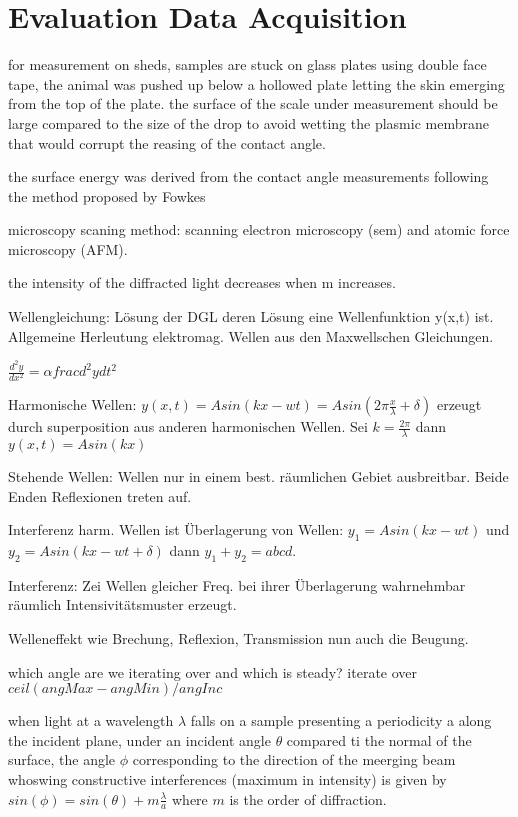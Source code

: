 
\section{Evaluation Data Acquisition}


for measurement on sheds, samples are stuck on glass plates using double face tape, the animal was pushed up below a hollowed plate letting the skin emerging from the top of the plate. the surface of the scale under measurement should be large compared to the size of the drop to avoid wetting the plasmic membrane that would corrupt the reasing of the contact angle. 

the surface energy was derived from the contact angle measurements following the method proposed by Fowkes


microscopy
scaning method: scanning electron microscopy (sem) and atomic force microscopy (AFM). 

the intensity of the diffracted light decreases when m increases.


Wellengleichung: Lösung der DGL deren Lösung eine Wellenfunktion y(x,t) ist. Allgemeine Herleutung elektromag. Wellen aus den Maxwellschen Gleichungen.

$\frac{d^2 y}{dx^2} = \alpha frac{d^2 y}{dt^2}$

Harmonische Wellen: $y(x,t) = A sin(kx - wt) = A sin(2\pi \frac{x}{\lambda} + \delta)$ erzeugt durch superposition aus anderen harmonischen Wellen. Sei $k = \frac{2 \pi}{\lambda}$ dann $y(x,t) = A sin(kx)$

Stehende Wellen: Wellen nur in einem best. räumlichen Gebiet ausbreitbar. Beide Enden Reflexionen treten auf.

Interferenz harm. Wellen ist Überlagerung von Wellen: $y_1 = A sin(kx - wt)$ und $y_2 = A sin(kx - wt + \delta)$ dann $y_1 + y_2 = abcd$.

Interferenz: Zei Wellen gleicher Freq. bei ihrer Überlagerung wahrnehmbar räumlich Intensivitätsmuster erzeugt.

Welleneffekt wie Brechung, Reflexion, Transmission nun auch die Beugung.

which angle are we iterating over and which is steady?
iterate over $ceil(angMax - angMin) / angInc$

when light at a wavelength $\lambda$ falls on a sample presenting a periodicity a along the incident plane, under an incident angle $\theta$ compared ti the normal of the surface, the angle $\phi$ corresponding to the direction of the meerging beam whoswing constructive interferences (maximum in intensity) is given by $sin(\phi) = sin(\theta) + m\frac{\lambda}{a}$
where $m$ is the order of diffraction. 


